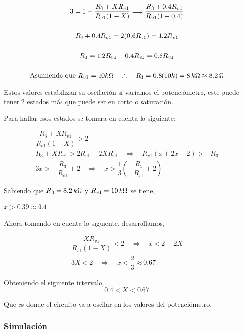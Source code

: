 \begin{enumerate}
            \begin{gather}
                3 = 1 + \frac{R_3 + XR_{v1}}{R_{v1}(1-X)} \Longrightarrow \frac{R_3 + 0.4R_{v1}}{R_{v1}(1-0.4)} \nonumber \\[0.5cm]
                R_3 + 0.4R_{v1} = 2(0.6R_{v1}) = 1.2R_{v1} \nonumber \\[0.5cm]
                R_3 = 1.2R_{v1} - 0.4R_{v1} = 0.8R_{v1} \nonumber \\[0.5cm]
                \text{Asumiendo que } R_{v1} = 10k\ohm \quad \therefore \quad R_3 = 0.8(10k) = 8 \, k\ohm \approx 8.2 \, \ohm \nonumber
            \end{gather}

            Estos valores estabilizan su oscilación si variamos el potenciómetro, este puede tener 2 estados más que puede ser en corto o saturación.

            Para hallar esos estados se tomara en cuenta lo siguiente:

            \begin{gather}
                \dfrac{R_3+XR_{v1}}{R_{v1}(1-X)}>2 \nonumber \\[0.5cm]
                R_3+XR_{v1}>2R_{v1}-2XR_{v1} \quad \Rightarrow \quad R_{v1}(x+2x-2)>-R_3 \nonumber \\[0.5cm]
                3x>-\dfrac{R_3}{R_{v1}}+2 \quad \Rightarrow \quad x>\dfrac{1}{3}\left(-\dfrac{R_3}{R_{v1}}+2 \right) \nonumber
            \end{gather}

            Sabiendo que $R_3=8.2 \, k \ohm$ y $R_{v1}=10 \, k \ohm$ se tiene,

            $x>0.39 \approx 0.4$

            Ahora tomando en cuenta lo siguiente, desarrollamos,

            \begin{gather*}
                \dfrac{XR_{v1}}{R_{v1}(1-X)}<2 \quad \Rightarrow  \quad x<2-2X \\[0.5cm]
                3X<2 \quad \Rightarrow  \quad x<\dfrac{2}{3} \approx 0.67
            \end{gather*}

            Obteniendo el siguiente intervalo, $$0.4<X<0.67$$ 

            Que es donde el circuito va a oscilar en los valores del potenciómetro.
        
        \subsubsection{Simulación}
        

\end{enumerate}
